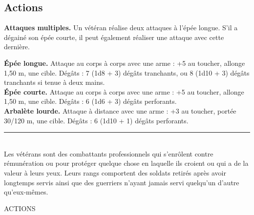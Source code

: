 \begin{figure*}[hb!]
{\begin{minipage}[c]{.45\linewidth}
    \subsection*{Actions}
    {\bfseries Attaques multiples.} Un vétéran réalise deux attaques à l'épée longue. S'il a dégainé son épée courte, il peut également réaliser une attaque avec cette dernière.
  \end{minipage}
  \hspace{4pt}
  \begin{minipage}[c]{.45\linewidth}
    {\bfseries Épée longue.} Attaque au corps à corps avec une arme : +5 au toucher, allonge 1,50 m, une cible. Dégâts : 7 (1d8 + 3) dégâts tranchants, ou 8 (1d10 + 3) dégâts tranchants si tenue à deux mains. \\
    {\bfseries Épée courte.} Attaque au corps à corps avec une arme : +5 au toucher, allonge 1,50 m, une cible. Dégâts : 6 (1d6 + 3) dégâts perforants. \\
    {\bfseries Arbalète lourde.} Attaque à distance avec une arme : +3 au toucher, portée 30/120 m, une cible. Dégâts : 6 (1d10 + 1) dégâts perforants. \\
    \noindent\rule{\textwidth}{1pt} \\
Les vétérans sont des combattants professionnels qui s'enrôlent contre rémunération ou pour protéger quelque chose en laquelle ils croient ou qui a de la valeur à leurs yeux. Leurs rangs comportent des soldats retirés après avoir longtemps servis ainsi que des guerriers n'ayant jamais servi quelqu'un d'autre qu'eux-mêmes.
  \end{minipage}
}%
\end{figure*}

ACTIONS


